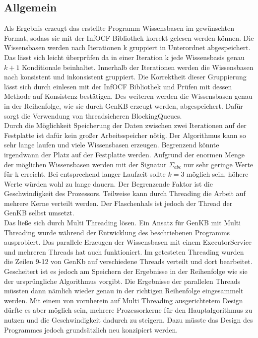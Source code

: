 \documentclass[12pt,a4paper]{article}
\begin{document}
\subsection{Allgemein}
Als Ergebnis erzeugt das erstellte Programm Wissensbasen im gewünschten Format, sodass sie mit der InfOCF Bibliothek korrekt gelesen werden können. Die Wissensbasen werden nach Iterationen k gruppiert in Unterordnet abgespeichert. Das lässt sich leicht überprüfen da in einer Iteration k jede Wissensbasis genau $k+1$ Konditionale beinhaltet. Innerhalb der Iterationen werden die Wissensbasen nach konsistent und inkonsistent gruppiert. Die Korrektheit dieser Gruppierung lässt sich durch einlesen mit der InfOCF Bibliothek und Prüfen mit dessen Methode auf Konsistenz bestätigen. Des weiteren werden die Wissensbasen genau in der Reihenfolge, wie sie durch GenKB erzeugt werden, abgespeichert. Dafür sorgt die Verwendung von threadsicheren BlockingQueues. \\
Durch die Möglichkeit Speicherung der Daten zwischen zwei Iterationen auf der Festplatte ist dafür kein großer Arbeitsspeicher nötig. Der Algorithmus kann so sehr lange laufen und viele Wissensbasen erzeugen. Begrenzend könnte irgendwann der Platz auf der Festplatte werden. Aufgrund der enormen Menge der möglichen Wissensbasen werden mit der Signatur $\Sigma_{abc}$ nur sehr geringe Werte für k erreicht. Bei entsprechend langer Laufzeit sollte $k=3$ möglich sein, höhere Werte würden wohl zu lange dauern. Der Begrenzende Faktor ist die Geschwindigkeit des Prozessors. Teilweise kann durch Threading die Arbeit auf mehrere Kerne verteilt werden. Der Flaschenhals ist jedoch der Thread der GenKB selbst umsetzt.\\
Das ließe sich durch Multi Threading lösen. Ein Ansatz für GenKB mit Multi Threading wurde während der Entwicklung des beschriebenen Programms ausprobiert. Das parallele Erzeugen der Wissensbasen mit einem ExecutorService und mehreren Threads hat auch funktioniert. Im getesteten Threading wurden die Zeilen 9-12 von GenKb auf verschiedene Threads verteilt und dort bearbeitet. Gescheitert ist es jedoch am Speichern der Ergebnisse in der Reihenfolge wie sie der ursprüngliche Algorithmus vorgibt. Die Ergebnisse der parallelen Threads müssten dann nämlich wieder genau in der richtigen Reihenfolge eingesammelt werden. Mit einem von vornherein auf Multi Threading ausgerichtetem Design dürfte es aber möglich sein, mehrere Prozessorkerne für den Hauptalgorithmus zu nutzen und die Geschwindigkeit dadurch zu steigern. Dazu müsste das Design des Programmes jedoch grundsätzlich neu konzipiert werden.
\end{document}
